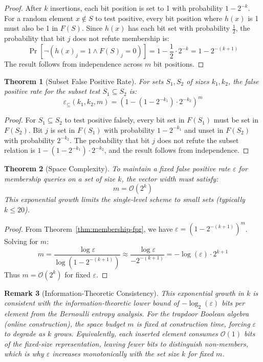 \documentclass[10pt,conference]{IEEEtran}
\newtheorem{theorem}{Theorem}
\newtheorem{remark}[theorem]{Remark}
\begin{document}
\begin{proof}
After $k$ insertions, each bit position is set to 1 with probability $1 - 2^{-k}$. For a random element $x \notin S$ to test positive, every bit position where $h(x)$ is 1 must also be 1 in $F(S)$. Since $h(x)$ has each bit set with probability $\frac{1}{2}$, the probability that bit $j$ does not refute membership is:
$$\Pr[\neg(h(x)_j = 1 \land F(S)_j = 0)] = 1 - \frac{1}{2} \cdot 2^{-k} = 1 - 2^{-(k+1)}$$
The result follows from independence across $m$ bit positions.
\end{proof}

\begin{theorem}[Subset False Positive Rate]
\label{thm:subset-fpr}
For sets $S_1, S_2$ of sizes $k_1, k_2$, the false positive rate for the subset test $S_1 \subseteq S_2$ is:
$$\varepsilon_{\subseteq}(k_1, k_2, m) = \left(1 - (1 - 2^{-k_1}) \cdot 2^{-k_2}\right)^m$$
\end{theorem}

\begin{proof}
For $S_1 \subseteq S_2$ to test positive falsely, every bit set in $F(S_1)$ must be set in $F(S_2)$. Bit $j$ is set in $F(S_1)$ with probability $1 - 2^{-k_1}$ and unset in $F(S_2)$ with probability $2^{-k_2}$. The probability that bit $j$ does not refute the subset relation is $1 - (1-2^{-k_1}) \cdot 2^{-k_2}$, and the result follows from independence.
\end{proof}

\begin{theorem}[Space Complexity]
\label{thm:space-complexity}
To maintain a fixed false positive rate $\varepsilon$ for membership queries on a set of size $k$, the vector width must satisfy:
$$m = \mathcal{O}(2^k)$$
This exponential growth limits the single-level scheme to small sets (typically $k \leq 20$).
\end{theorem}

\begin{proof}
From Theorem~\ref{thm:membership-fpr}, we have $\varepsilon = (1 - 2^{-(k+1)})^m$. Solving for $m$:
$$m = \frac{\log \varepsilon}{\log(1 - 2^{-(k+1)})} \approx \frac{\log \varepsilon}{-2^{-(k+1)}} = -\log(\varepsilon) \cdot 2^{k+1}$$
Thus $m = \mathcal{O}(2^k)$ for fixed $\varepsilon$.
\end{proof}

\begin{remark}[Information-Theoretic Consistency]
\label{rem:info-theoretic-bound}
This exponential growth in $k$ is consistent with the information-theoretic lower bound of $-\log_2(\varepsilon)$ bits per element from the Bernoulli entropy analysis. For the trapdoor Boolean algebra (online construction), the space budget $m$ is fixed at construction time, forcing $\varepsilon$ to degrade as $k$ grows. Equivalently, each inserted element consumes $\mathcal{O}(1)$ bits of the fixed-size representation, leaving fewer bits to distinguish non-members, which is why $\varepsilon$ increases monotonically with the set size $k$ for fixed $m$.
\end{remark}
\end{document}
